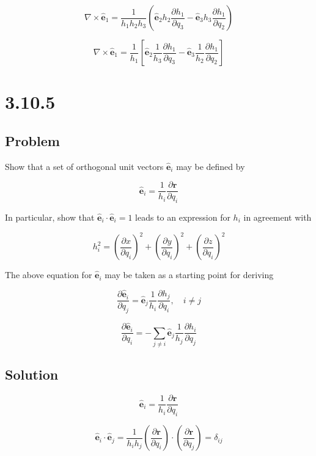 \documentclass[12pt]{article}
\begin{document}
\[
    \nabla \times \hat{\textbf{e}}_1 = \frac{1}{h_1 h_2 h_3}
    \left(
    \hat{\textbf{e}}_2 h_2 \frac{\partial h_1}{\partial q_3}
    - \hat{\textbf{e}}_3 h_3 \frac{\partial h_1}{\partial q_2}
    \right)
\]

\[
    \nabla \times \hat{\textbf{e}}_1 = \frac{1}{h_1}
    \left[
        \hat{\textbf{e}}_2 \frac{1}{h_3} \frac{\partial h_1}{\partial q_3}
        - \hat{\textbf{e}}_3  \frac{1}{h_2}  \frac{\partial h_1}{\partial q_2}
        \right]
\]

\section{3.10.5}

\subsection{Problem}

Show that a set of orthogonal unit vectors \(\hat{\textbf{e}}_i\) may be defined by

\[
    \hat{\textbf{e}}_i = \frac{1}{h_i} \frac{\partial \textbf{r}}{\partial q_i}
\]

In particular, show that \(\hat{\textbf{e}}_i \cdot \hat{\textbf{e}}_i = 1\)  leads to an expression for
\(h_i\) in agreement with

\[
    h_i^2 = {\left(\frac{\partial x}{\partial q_i}\right)}^2
    + {\left(\frac{\partial y}{\partial q_i}\right)}^2 + {\left(\frac{\partial z}{\partial q_i}\right)}^2
\]

The above equation for \(\hat{\textbf{e}}_i\) may be taken as a starting point for deriving

\[
    \frac{\partial \hat{\textbf{e}}_i}{\partial q_j}
    = \hat{\textbf{e}}_j \frac{1}{h_i} \frac{\partial h_j}{\partial q_i}, \quad i \neq j
\]

\[
    \frac{\partial \hat{\textbf{e}}_i}{\partial q_i}
    = - \sum_{j \neq i} \hat{\textbf{e}}_j \frac{1}{h_j} \frac{\partial h_i}{\partial q_j}
\]

\subsection{Solution}

\[
    \hat{\textbf{e}}_i = \frac{1}{h_i} \frac{\partial \textbf{r}}{\partial q_i}
\]

\[
    \hat{\textbf{e}}_i \cdot \hat{\textbf{e}}_j = \frac{1}{h_i h_j}
    \left(\frac{\partial \textbf{r}}{\partial q_i}\right)
    \cdot \left(\frac{\partial \textbf{r}}{\partial q_j}\right)  = \delta_{ij}
\]
\end{document}
